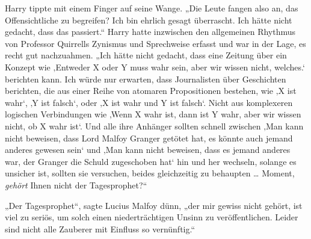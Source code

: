Harry tippte mit einem Finger auf seine Wange.
„Die Leute fangen also an, das Offensichtliche zu begreifen? Ich bin ehrlich gesagt überrascht. Ich hätte nicht gedacht, dass das passiert.“
Harry hatte inzwischen den allgemeinen Rhythmus von Professor Quirrells Zynismus und Sprechweise erfasst und war in der Lage, es recht gut nachzuahmen.
„Ich hätte nicht gedacht, dass eine Zeitung über ein Konzept wie ‚Entweder X oder Y muss wahr sein, aber wir wissen nicht, welches.‘ berichten kann. Ich würde nur erwarten, dass Journalisten über Geschichten berichten, die aus einer Reihe von atomaren Propositionen bestehen, wie ‚X ist wahr‘, ‚Y ist falsch‘, oder ‚X ist wahr und Y ist falsch‘. Nicht aus komplexeren logischen Verbindungen wie ‚Wenn X wahr ist, dann ist Y wahr, aber wir wissen nicht, ob X wahr ist‘. Und alle ihre Anhänger sollten schnell zwischen ‚Man kann nicht beweisen, dass Lord Malfoy Granger getötet hat, es könnte auch jemand anderes gewesen sein‘ und ‚Man kann nicht beweisen, dass es jemand anderes war, der Granger die Schuld zugeschoben hat‘ hin und her wechseln, solange es unsicher ist, sollten sie versuchen, beides gleichzeitig zu behaupten … Moment, \emph{gehört} Ihnen nicht der Tagesprophet?“

„Der Tagesprophet“, sagte Lucius Malfoy dünn, „der mir gewiss nicht gehört, ist viel zu seriös, um solch einen niederträchtigen Unsinn zu veröffentlichen. Leider sind nicht alle Zauberer mit Einfluss so vernünftig.“

